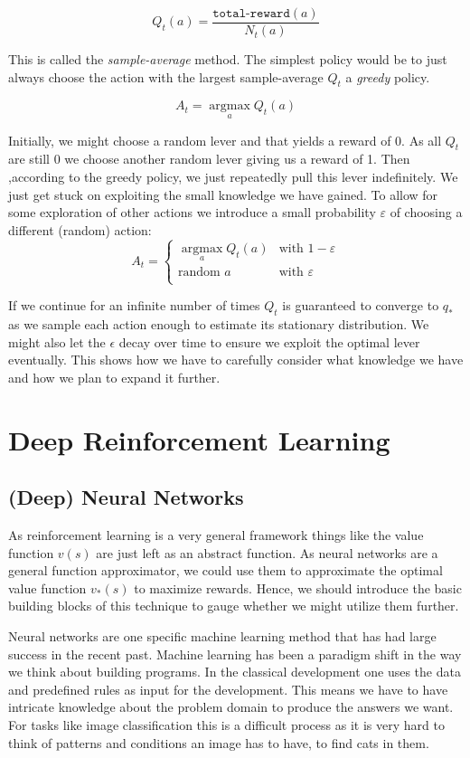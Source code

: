 $$
    Q_t(a) = \frac{\texttt{total-reward}(a)}{N_t(a)}
$$

This is called the \textit{sample-average} method. The simplest policy would be to just always choose the action with the largest sample-average $ Q_t $ a \textit{greedy} policy.

$$
    A_t = \operatorname*{argmax}_a Q_t(a)
$$

Initially, we might choose a random lever and that yields a reward of 0. As all $ Q_t $ are still 0 we choose another random lever giving us a reward of 1. Then ,according to the greedy policy, we just repeatedly pull this lever indefinitely. We just get stuck on exploiting the small knowledge we have gained. To allow for some exploration of other actions we introduce a small probability $\varepsilon $ of choosing a different (random) action:
$$
    A_t =
    \begin{cases}
        \operatorname*{argmax}_a Q_t(a) & \text{with } 1 - \varepsilon \\
        \text{random } a                & \text{with }  \varepsilon    \\
    \end{cases}
$$

If we continue for an infinite number of times $ Q_t $ is guaranteed to converge to $ q_{*} $ as we sample each action enough to estimate its stationary distribution. We might also let the $ \epsilon $ decay over time to ensure we exploit the optimal lever eventually. This shows how we have to carefully consider what knowledge we have and how we plan to expand it further.
\section{Deep Reinforcement Learning}
\subsection{(Deep) Neural Networks}
\label{neural_networks}
As reinforcement learning is a very general framework things like the value function $ v(s)$ are just left as an abstract function. As neural networks are a general function approximator, we could use them to approximate the optimal value function $ v_{*}(s) $ to maximize rewards. Hence, we should introduce the basic building blocks of this technique to gauge whether we might utilize them further.

Neural networks are one specific machine learning method that has had large success in the recent past. Machine learning has been a paradigm shift in the way we think about building programs. In the classical development one uses the data and predefined rules as input for the development. This means we have to have intricate knowledge about the problem domain to produce the answers we want. For tasks like image classification this is a difficult process as it is very hard to think of patterns and conditions an image has to have, to find cats in them.

